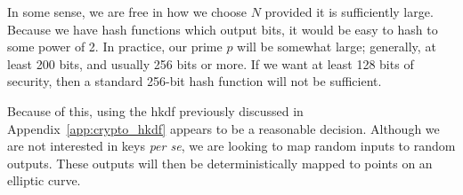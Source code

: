 In some sense, we are free in how we choose $N$ provided it is
sufficiently large.
Because we have \glspl{hash function} which output bits,
it would be easy to hash to some power of 2.
In practice, our prime $p$ will be somewhat large;
generally, at least 200 bits, and usually 256 bits or more.
If we want at least 128 bits of security, then a standard 256-bit
\gls{hash function} will not be sufficient.

Because of this, using the \gls{hkdf} previously discussed in
Appendix~\ref{app:crypto_hkdf} appears to be a reasonable decision.
Although we are not interested in keys \emph{per se},
we are looking to map random inputs
to random outputs.
These outputs will then be deterministically mapped to points
on an \gls{elliptic curve}.
